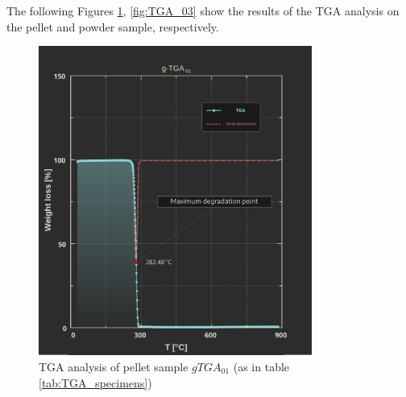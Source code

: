 \documentclass[a4paper]{article}
\begin{document}
        The following Figures \ref{fig:TGA_01}, \ref{fig:TGA_03} show the results of the TGA analysis on the pellet and powder sample, respectively. \\ 
        \begin{figure}[H]
            \centering
            \includegraphics[width=0.8\textwidth]{Pictures/Thermal_analysis_plots/TGA_catalogued/Fixed/g-TGA01.pdf}
            \caption{TGA analysis of pellet sample $gTGA_{01}$ (as in table \ref{tab:TGA_specimens})}
            \label{fig:TGA_01}
        \end{figure}
\end{document}
